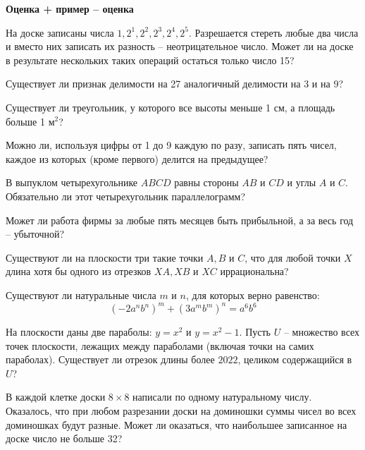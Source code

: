 \documentclass{article}
\begin{document}
    \large

    \begin{center}
        \textbf{Оценка + пример -- оценка}
    \end{center}

    \begin{enumerate_boxed}

        \item На доске записаны числа $1, 2^1, 2^2, 2^3, 2^4, 2^5$.
        Разрешается стереть любые два числа и вместо них записать их разность – неотрицательное число.
        Может ли на доске в результате нескольких таких операций остаться только число 15?

        \item Существует ли признак делимости на 27 аналогичный делимости на 3 и на 9?

        \item Существует ли треугольник, у которого все высоты меньше 1 см, а площадь больше 1 м$^2$?

        \item Можно ли, используя цифры от 1 до 9 каждую по разу, записать пять чисел, каждое из которых (кроме первого) делится на предыдущее?

        \item В выпуклом четырехугольнике $ABCD$ равны стороны $AB$ и $CD$ и углы $A$ и $C$.
        Обязательно ли этот четырехугольник параллелограмм?

        \item Может ли работа фирмы за любые пять месяцев быть прибыльной, а за весь год – убыточной?

        \item Существуют ли на плоскости три такие точки $A, B$ и $C$, что для любой точки $X$ длина хотя бы одного из отрезков $XA, XB$ и $XC$ иррациональна?

        \item Существуют ли натуральные числа $m$ и $n$, для которых верно равенство:  \[(-2a^{n}b^n)^m + (3a^{m}b^m)^n = a^{6}b^6\]

        \item На плоскости даны две параболы: $y=x^2$ и $y=x^2-1$.
        Пусть $U$ – множество всех точек плоскости, лежащих между параболами (включая точки на самих параболах).
        Существует ли отрезок длины более $2022$, целиком содержащийся в $U$?

        \item В каждой клетке доски $8\times 8$ написали по одному натуральному числу.
        Оказалось, что при любом разрезании доски на доминошки суммы чисел во всех доминошках будут разные.
        Может ли оказаться, что наибольшее записанное на доске число не больше 32?


\end{enumerate_boxed}
\end{document}
